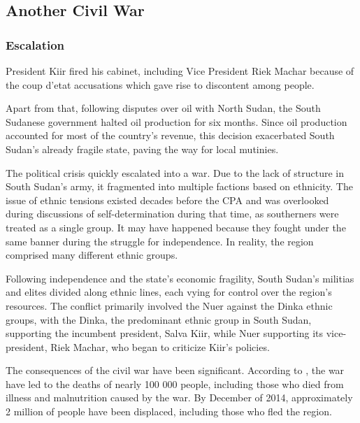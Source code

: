 \documentclass[14pt,a4paper]{article}
\begin{document}
\subsection{Another Civil War}

\subsubsection{Escalation}
President Kiir fired his cabinet, including Vice President Riek Machar because of the coup d'etat accusations which gave rise to discontent among people.  

Apart from that, following disputes over oil with North Sudan, the South Sudanese government halted oil production for six months. Since oil production accounted for most of the country's revenue, this decision exacerbated South Sudan's already fragile state, paving the way for local mutinies. 

The political crisis quickly escalated into a war. Due to the lack of structure in South Sudan's army, it fragmented into multiple factions based on ethnicity. The issue of ethnic tensions existed decades before the CPA and was overlooked during discussions of self-determination during that time, as southerners were treated as a single group. It may have happened because they fought under the same banner during the struggle for independence. In reality, the region comprised many different ethnic groups. 

Following independence and the state's economic fragility, South Sudan's militias and elites divided along ethnic lines, each vying for control over the region's resources. The conflict primarily involved the Nuer against the Dinka ethnic groups, with the Dinka, the predominant ethnic group in South Sudan, supporting the incumbent president, Salva Kiir, while Nuer supporting its vice-president, Riek Machar, who began to criticize Kiir's policies.

The consequences of the civil war have been significant. According to \cite{rolandsen2015year}, the war have led to the deaths of nearly 100 000 people, including those who died from illness and malnutrition caused by the war. By December of 2014, approximately 2 million of people have been displaced, including those who fled the region. 
\end{document}
